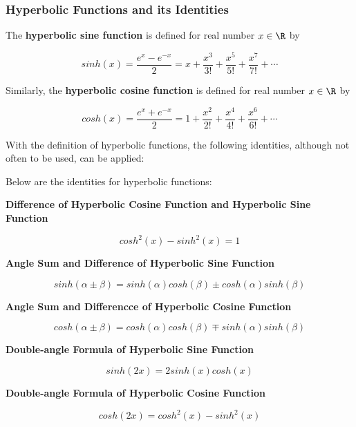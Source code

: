 \subsubsection{Hyperbolic Functions and its Identities}
\begin{dft}
  The \textbf{hyperbolic sine function} is defined for real number $x\in \R$ by

  $$sinh(x)=\frac{e^{x}-e^{-x}}{2}=x+\frac{x^{3}}{3!}+\frac{x^{5}}{5!}+\frac{x^{7}}{7!}+\cdots$$

  Similarly, the \textbf{hyperbolic cosine function} is defined for real number $x\in \R$ by

  $$cosh(x)=\frac{e^{x}+e^{-x}}{2}=1+\frac{x^{2}}{2!}+\frac{x^{4}}{4!}+\frac{x^{6}}{6!}+\cdots$$
\end{dft}\n

With the definition of hyperbolic functions, the following identities, although not often to be used, can be applied:\n

\begin{thm}
  Below are the identities for hyperbolic functions:

  \begin{alist}
    \item \textbf{Difference of Hyperbolic Cosine Function and Hyperbolic Sine Function}

    $$cosh^{2}(x)-sinh^{2}(x)=1$$

    \item \textbf{Angle Sum and Difference of Hyperbolic Sine Function}

    $$sinh(\alpha\pm \beta)=sinh(\alpha)cosh(\beta)\pm cosh(\alpha)sinh(\beta)$$

    \item \textbf{Angle Sum and Differencce of Hyperbolic Cosine Function}

    $$cosh(\alpha\pm \beta)=cosh(\alpha)cosh(\beta)\mp sinh(\alpha)sinh(\beta)$$

    \item \textbf{Double-angle Formula of Hyperbolic Sine Function}

    $$sinh(2x)=2sinh(x)cosh(x)$$

    \item \textbf{Double-angle Formula of Hyperbolic Cosine Function}

    $$cosh(2x)=cosh^{2}(x)-sinh^{2}(x)$$

  \end{alist}
\end{thm}\n


